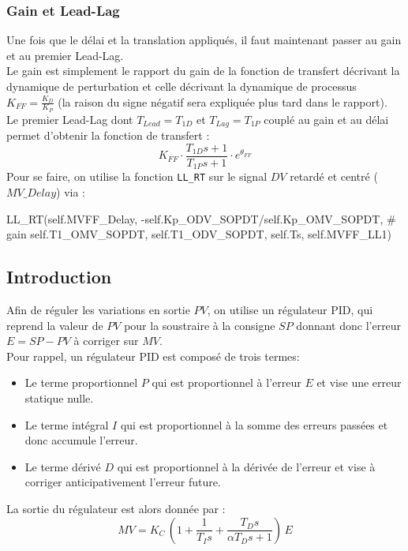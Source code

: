 \subsubsection{Gain et Lead-Lag}
Une fois que le délai et la translation appliqués, il faut maintenant passer au gain et au premier Lead-Lag.
\\Le gain est simplement le rapport du gain de la fonction de transfert décrivant la dynamique de perturbation et celle décrivant la dynamique de processus $K_{FF} = \frac{K_D}{K_P}$ (la raison du signe négatif sera expliquée plus tard dans le rapport).
\\Le premier Lead-Lag dont $T_{Lead} = T_{1D}$ et $T_{Lag} = T_{1P}$ couplé au gain et au délai permet d'obtenir la fonction de transfert : 
\[K_{FF}\cdot\frac{T_{1D}s + 1}{T_{1P}s + 1} \cdot e^{\theta_{FF}}\]
Pour se faire, on utilise la fonction \texttt{LL\_RT} sur le signal $DV$ retardé et centré ($MV\_Delay$) via : 
\begin{python*}
	LL_RT(self.MVFF_Delay, 
	-self.Kp_ODV_SOPDT/self.Kp_OMV_SOPDT, # gain
	self.T1_OMV_SOPDT, 
	self.T1_ODV_SOPDT, 
	self.Ts, 
	self.MVFF_LL1)
\end{python*}

\subsection{Introduction}
Afin de réguler les variations en sortie $PV$, on utilise un régulateur PID, qui reprend la valeur de $PV$ pour la soustraire à la consigne $SP$ donnant donc l'erreur $E = SP - PV$ à corriger sur $MV$.\\
Pour rappel, un régulateur PID est composé de trois termes:
\begin{itemize}
    \item Le terme proportionnel $P$ qui est proportionnel à l'erreur $E$ et vise une erreur statique nulle.
    \item Le terme intégral $I$ qui est proportionnel à la somme des erreurs passées et donc accumule l'erreur.
    \item Le terme dérivé $D$ qui est proportionnel à la dérivée de l'erreur et vise à corriger anticipativement l'erreur future.
\end{itemize}
La sortie du régulateur est alors donnée par :
\begin{equation}
    MV = K_C \, \left( 1 + \frac{1}{T_I s} + \frac{T_D s}{\alpha T_D s + 1}\right) \, E
\end{equation}

